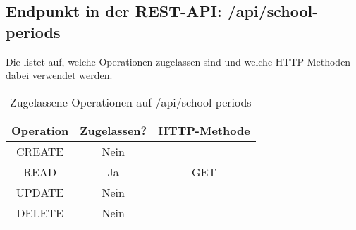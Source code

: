 \subsection{Endpunkt in der REST-API: /api/school-periods}
\label{sec:end:rest:api:school-periods}
Die  listet auf, welche Operationen zugelassen sind und welche HTTP-Methoden dabei verwendet werden. 


\begin{table}[!htbp]
	\begin{tabular}{|c|c|c|}
		\hline
			\textbf{Operation} & \textbf{Zugelassen?} & \textbf{HTTP-Methode} \\ \hline
			CREATE & Nein & \\ \hline 
			READ & Ja & GET \\ \hline
			UPDATE & Nein & \\ \hline 
			DELETE & Nein & \\ \hline
	\end{tabular}

		\caption{Zugelassene Operationen auf /api/school-periods}
		\label{tab:end:rest:api:schools_years:meth}
\end{table}